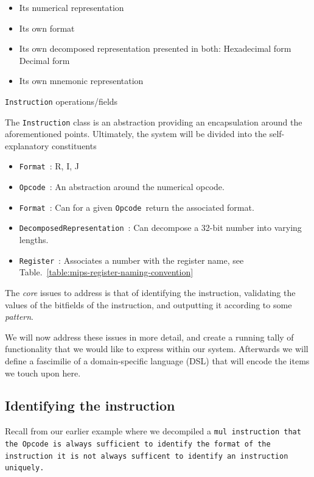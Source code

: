 \documentclass[a4paper]{article}
\newcommand{\opcode}{Opcode\ }
\newcommand{\opcodem}{\texttt{Opcode}\ }
\newcommand{\formatm}{\texttt{Format}\ }
\newcommand{\decomposedm}{\texttt{DecomposedRepresentation}\ }
\newcommand{\registerm}{\texttt{Register}\ }
\newcommand{\mij}[1]{\texttt{#1}}
\begin{document}
\begin{table}
\begin{itemize}
\item Its numerical representation
\item Its own format
\item Its own decomposed representation presented in both:
\subitem Hexadecimal form
\subitem Decimal form
\item Its own mnemonic representation
\end{itemize}
\caption{\mij{Instruction} operations/fields}
\label{table:instruction-operations}
\end{table}

The \mij{Instruction} class is an abstraction providing an
encapsulation around the aforementioned points. Ultimately, the system
will be divided into the self-explanatory constituents

\begin{itemize}
\item \formatm: R, I, J
\item \opcodem: An abstraction around the numerical opcode.
\item \formatm: Can for a given \opcodem return the associated format.
\item \decomposedm: Can decompose a 32-bit number into varying lengths.
\item \registerm: Associates a number with the register name, 
      see Table.~\ref{table:mips-register-naming-convention}
\end{itemize}

The \emph{core} issues to address is that of identifying the
instruction, validating the values of the bitfields of the
instruction, and outputting it according to some \emph{pattern}.

We will now address these issues in more detail, and create a running
tally of functionality that we would like to express within our
system. Afterwards we will define a fascimilie of a domain-specific
language (DSL) that will encode the items we touch upon here.

\subsection{Identifying the instruction}\label{section:identification}

Recall from our earlier example where we decompiled a \tt{mul}
instruction that the \opcode is always sufficient to identify
the format of the instruction it is not always sufficent to
identify an instruction uniquely.
\end{document}
